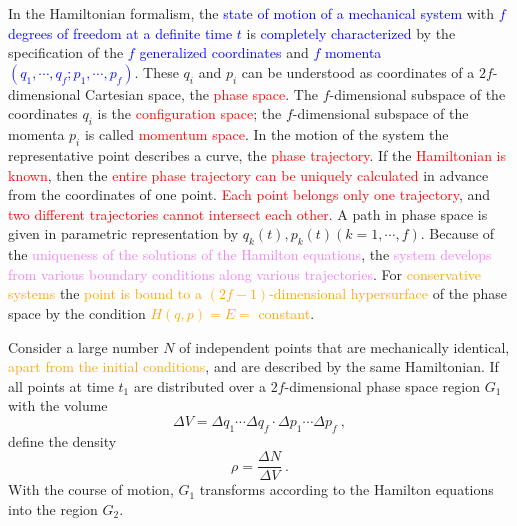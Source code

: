 \documentclass[11pt,a4paper]{article}
\begin{document}
\cite{greiner2009classical} In the Hamiltonian formalism, the \textcolor{blue}{state of motion of a mechanical system} with \textcolor{blue}{$f$ degrees of freedom at a definite time $t$} is \textcolor{blue}{completely characterized} by the specification of the \textcolor{blue}{$f$ generalized coordinates} and \textcolor{blue}{$f$ momenta $(q_1, \cdots, q_f; p_1, \cdots, p_f)$}.  These $q_i$ and $p_i$ can be understood as coordinates of a $2f$-dimensional Cartesian space, the \textcolor{red}{phase space}. The $f$-dimensional subspace of the coordinates $q_i$ is the \textcolor{red}{configuration space}; the $f$-dimensional subspace of the momenta $p_i$ is called \textcolor{red}{momentum space}. In the motion of the system the representative point describes a curve, the \textcolor{red}{phase trajectory}. If the \textcolor{red}{Hamiltonian is known}, then the \textcolor{red}{entire phase trajectory can be uniquely calculated} in advance from the coordinates of one point. \textcolor{red}{Each point belongs only one trajectory}, and \textcolor{red}{two different trajectories cannot intersect each other}. A path in phase space is given in parametric representation by $q_k(t), p_k(t) (k = 1, \cdots, f)$. Because of the \textcolor{violet}{uniqueness of the solutions of the Hamilton equations}, the \textcolor{violet}{system develops from various boundary conditions along various trajectories}. For \textcolor{orange}{conservative systems} the \textcolor{orange}{point is bound to a $(2f -1)$-dimensional hypersurface} of the phase space by the condition \textcolor{orange}{$H(q, p) = E =$ constant}.

Consider a large number $N$ of independent points that are mechanically identical, \textcolor{orange}{apart from the initial conditions}, and are described by the same Hamiltonian. If all points at time $t_1$ are distributed over a $2f$-dimensional phase space region $G_1$ with the volume
\begin{equation*}
\Delta V = \Delta q_1 \cdots \Delta q_f \cdot \Delta p_1 \cdots \Delta p_f ~,
\end{equation*}
define the density
\begin{equation*}
\rho = \dfrac{\Delta N}{\Delta V} ~.
\end{equation*}
With the course of motion, $G_1$ transforms according to the Hamilton equations into the region $G_2$. 
\end{document}
